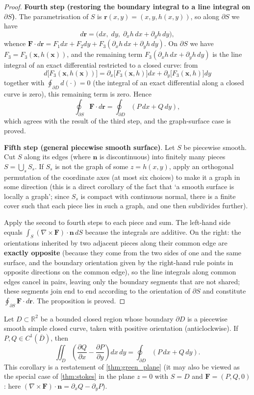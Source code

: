 \begin{proof}
\textbf{Fourth step (restoring the boundary integral to a line integral on $\partial S$)}. The parametrisation of $S$ is $\mathbf r(x,y)=(x,y,h(x,y))$, so along $\partial S$ we have
\[
d\mathbf r = \bigl(dx,\;dy,\;\partial_xh\,dx+\partial_yh\,dy\bigr),
\]
whence $\mathbf F\cdot d\mathbf r = F_1dx+F_2dy+F_3(\partial_xh\,dx+\partial_yh\,dy)$. On $\partial S$ we have $F_3=F_3(\mathbf x,h(\mathbf x))$, and the remaining term $F_3(\partial_xh\,dx+\partial_yh\,dy)$ is the line integral of an exact differential restricted to a closed curve: from
\[
d\bigl[F_3(\mathbf x,h(\mathbf x))\bigr] = \partial_x\bigl[F_3(\mathbf x,h)\bigr]dx+\partial_y\bigl[F_3(\mathbf x,h)\bigr]dy
\]
together with $\oint_{\partial D}d(\cdot)=0$ (the integral of an exact differential along a closed curve is zero), this remaining term is zero. Hence
\[
\oint_{\partial S}\mathbf F\cdot d\mathbf r = \oint_{\partial D}(P\,dx+Q\,dy),
\]
which agrees with the result of the third step, and the graph-surface case is proved.

\textbf{Fifth step (general piecewise smooth surface)}. Let $S$ be piecewise smooth. Cut $S$ along its edges (where $\mathbf n$ is discontinuous) into finitely many pieces $S=\bigcup_sS_s$. If $S_s$ is not the graph of some $z=h(x,y)$, apply an orthogonal permutation of the coordinate axes (at most six choices) to make it a graph in some direction (this is a direct corollary of the fact that `a smooth surface is locally a graph'; since $S_s$ is compact with continuous normal, there is a finite cover such that each piece lies in such a graph, and one then subdivides further).

Apply the second to fourth steps to each piece and sum. The left-hand side equals $\int_S(\nabla\times\mathbf F)\cdot\mathbf n\,dS$ because the integrals are additive. On the right: the orientations inherited by two adjacent pieces along their common edge are \textbf{exactly opposite} (because they come from the two sides of one and the same surface, and the boundary orientation given by the right-hand rule points in opposite directions on the common edge), so the line integrals along common edges cancel in pairs, leaving only the boundary segments that are not shared; these segments join end to end according to the orientation of $\partial S$ and constitute $\oint_{\partial S}\mathbf F\cdot d\mathbf r$. The proposition is proved.
\end{proof}

\begin{corollary}\label{cor:green}
Let $D \subset \mathbb{R}^2$ be a bounded closed region whose boundary $\partial D$ is a piecewise smooth simple closed curve, taken with positive orientation (anticlockwise). If $P, Q \in C^1(\overline{D})$, then
\[
\iint_D \left( \frac{\partial Q}{\partial x} - \frac{\partial P}{\partial y} \right) dx\, dy = \oint_{\partial D} (P \, dx + Q \, dy).
\]
This corollary is a restatement of \cref{thm:green_plane} (it may also be viewed as the special case of \cref{thm:stokes} in the plane $z=0$ with $S=D$ and $\mathbf F=(P,Q,0)$: here $(\nabla\times\mathbf F)\cdot\mathbf n=\partial_xQ-\partial_yP$).
\end{corollary}

